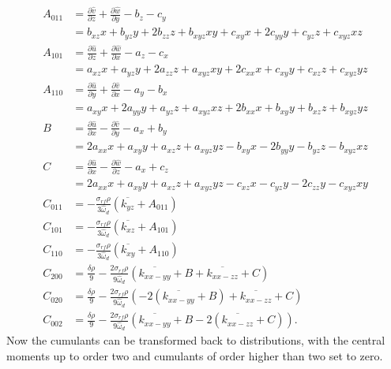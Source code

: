 \begin{align}
	A_{011} &= \frac{\partial \hat{v}}{\partial z} + \frac{\partial \hat{w}}{\partial y} - b_z - c_y \\
	&= b_{xz} x + b_{yz} y + 2 b_{zz} z + b_{xyz} xy + c_{xy} x + 2 c_{yy} y + c_{yz} z + c_{xyz} xz \\
	A_{101} &= \frac{\partial \hat{u}}{\partial z} + \frac{\partial \hat{w}}{\partial x} - a_z - c_x \\
	&= a_{xz} x + a_{yz} y + 2 a_{zz} z + a_{xyz} xy + 2 c_{xx} x + c_{xy} y + c_{xz} z + c_{xyz} yz \\
	A_{110} &= \frac{\partial \hat{u}}{\partial y} + \frac{\partial \hat{v}}{\partial x} - a_y - b_x \\
	&= a_{xy} x + 2 a_{yy} y + a_{yz} z + a_{xyz} xz + 2 b_{xx} x + b_{xy} y + b_{xz} z + b_{xyz} yz \\
	B &= \frac{\partial \hat{u}}{\partial x} - \frac{\partial \hat{v}}{\partial y} - a_x + b_y \\
	&= 2 a_{xx} x + a_{xy} y + a_{xz} z + a_{xyz} yz - b_{xy} x - 2 b_{yy} y - b_{yz} z - b_{xyz} xz \\
	C &= \frac{\partial \hat{u}}{\partial x} - \frac{\partial \hat{w}}{\partial z} - a_x + c_z \\
	&= 2 a_{xx} x + a_{xy} y + a_{xz} z + a_{xyz} yz - c_{xz} x - c_{yz} y - 2 c_{zz} y - c_{xyz} xy\\
	C_{011} &= - \frac{\sigma_{rf} \rho}{3 \hat{\omega}_d} \left( \overline{k_{yz}} + A_{011} \right)\\
	C_{101} &= - \frac{\sigma_{rf} \rho}{3 \hat{\omega}_d} \left( \overline{k_{xz}} + A_{101} \right) \\
	C_{110} &= - \frac{\sigma_{rf} \rho}{3 \hat{\omega}_d} \left( \overline{k_{xy}} + A_{110} \right) \\
	C_{200} &= \frac{\delta \rho}{9} - \frac{2 \sigma_{rf} \rho}{9 \hat{\omega}_d} \left( \overline{k_{xx-yy}} + B + \overline{k_{xx-zz}} + C \right) \\
	C_{020} &= \frac{\delta \rho}{9} - \frac{2 \sigma_{rf} \rho}{9 \hat{\omega}_d} \left( -2 \left(\overline{k_{xx-yy}} + B\right) + \overline{k_{xx-zz}} + C \right) \\
	C_{002} &= \frac{\delta \rho}{9} - \frac{2 \sigma_{rf} \rho}{9 \hat{\omega}_d} \left( \overline{k_{xx-yy}} + B - 2 \left( \overline{k_{xx-zz}} + C \right) \right).
\end{align}
Now the cumulants can be transformed back to distributions, with the central moments up to order two and cumulants of order higher than two set to zero.
